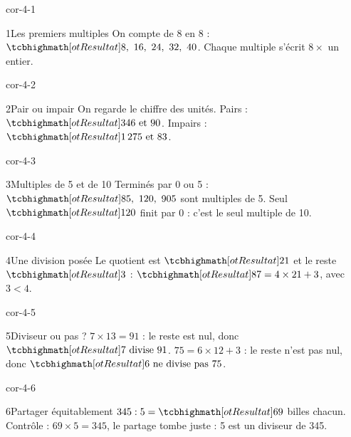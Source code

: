 \clearpage\pagestyle{otMain}\setlength{\otBlocEspacement}{2.5mm}\fontsize{11}{15}\selectfont{}
\begin{blocLivre}{cor-4-1}\begin{corrige}{1}{Les premiers multiples}
On compte de 8 en 8 : $\res{8,\ 16,\ 24,\ 32,\ 40}$. Chaque multiple s’écrit $8\times$ un entier.
\end{corrige}\end{blocLivre}
\begin{blocLivre}{cor-4-2}\begin{corrige}{2}{Pair ou impair}
On regarde le chiffre des unités. Pairs : $\res{346\text{ et }90}$. Impairs : $\res{1\,275\text{ et }83}$.
\end{corrige}\end{blocLivre}
\begin{blocLivre}{cor-4-3}\begin{corrige}{3}{Multiples de 5 et de 10}
Terminés par 0 ou 5 : $\res{85,\ 120,\ 905}$ sont multiples de 5. Seul $\res{120}$ finit par 0 : c’est le seul multiple de 10.
\end{corrige}\end{blocLivre}
\begin{blocLivre}{cor-4-4}\begin{corrige}{4}{Une division posée}
Le quotient est $\res{21}$ et le reste $\res3$ : $\res{87=4\times21+3}$, avec $3<4$.
\end{corrige}\end{blocLivre}
\begin{blocLivre}{cor-4-5}\begin{corrige}{5}{Diviseur ou pas ?}
$7\times13=91$ : le reste est nul, donc $\res{7\text{ divise }91}$. $75=6\times12+3$ : le reste n’est pas nul, donc $\res{6\text{ ne divise pas }75}$.
\end{corrige}\end{blocLivre}
\begin{blocLivre}{cor-4-6}\begin{corrige}{6}{Partager équitablement}
$345:5=\res{69}$ billes chacun. Contrôle : $69\times5=345$, le partage tombe juste : 5 est un diviseur de 345.
\end{corrige}\end{blocLivre}
